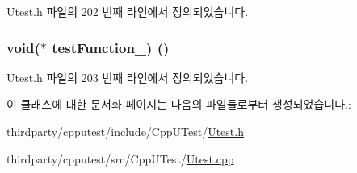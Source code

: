 Utest.\+h 파일의 202 번째 라인에서 정의되었습니다.

\subsubsection[{\texorpdfstring{test\+Function\+\_\+}{testFunction_}}]{\setlength{\rightskip}{0pt plus 5cm}void($\ast$ test\+Function\+\_\+) ()}\hypertarget{class_exec_function_test_shell_a8bd9b345a776ac6a0095aff4f4e31d03}{}\label{class_exec_function_test_shell_a8bd9b345a776ac6a0095aff4f4e31d03}


Utest.\+h 파일의 203 번째 라인에서 정의되었습니다.



이 클래스에 대한 문서화 페이지는 다음의 파일들로부터 생성되었습니다.\+:\begin{DoxyCompactItemize}
\item 
thirdparty/cpputest/include/\+Cpp\+U\+Test/\hyperlink{_utest_8h}{Utest.\+h}\item 
thirdparty/cpputest/src/\+Cpp\+U\+Test/\hyperlink{_utest_8cpp}{Utest.\+cpp}\end{DoxyCompactItemize}
